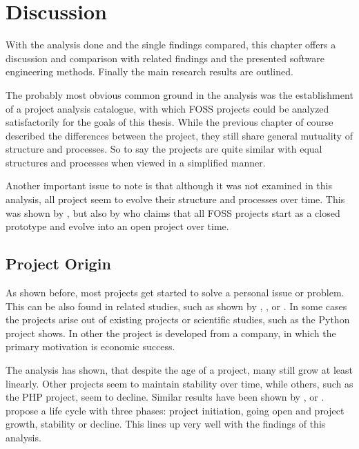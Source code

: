 \chapter{Discussion} %
\label{chap:discussion}

With the analysis done and the single findings compared, this chapter offers a
discussion and comparison with related findings and the presented software
engineering methods. Finally the main research results are outlined.

The probably most obvious common ground in the analysis was the establishment
of a project analysis catalogue, with which \ac{FOSS} projects could be
analyzed satisfactorily for the goals of this thesis. While the previous
chapter of course described the differences between the project, they still
share general mutuality of structure and processes. So to say the projects are
quite similar with equal structures and processes when viewed in a simplified
manner.

Another important issue to note is that although it was not examined in this
analysis, all project seem to evolve their structure and processes over time.
This was shown by \textcite{Scacchi2006}, \textcite{Godfrey2000} but also by
\textcite{Johnson2001} who claims that all \ac{FOSS} projects start as a closed
prototype and evolve into an open project over time.

\section{Project Origin} %

As shown before, most projects get started to solve a personal issue or
problem. This can be also found in related studies, such as shown by
\textcite{Raymond1998}, \textcite{Lakhani2003}, \cite{Hertel2003} or
\textcite{Johnson2001}. In some cases the projects arise out of existing
projects or scientific studies, such as the Python project shows. In other the
project is developed from a company, in which the primary motivation is
economic success.

The analysis has shown, that despite the age of a project, many still grow at
least linearly. Other projects seem to maintain stability over time, while
others, such as the PHP project, seem to decline. Similar results have been
shown by \textcite{Godfrey2000}, \textcite{Roets2007} or \textcite{Ogawa2007}.
\textcite{Schweik2003} propose a life cycle with three phases: project
initiation, going open and project growth, stability or decline. This lines up
very well with the findings of this analysis.

